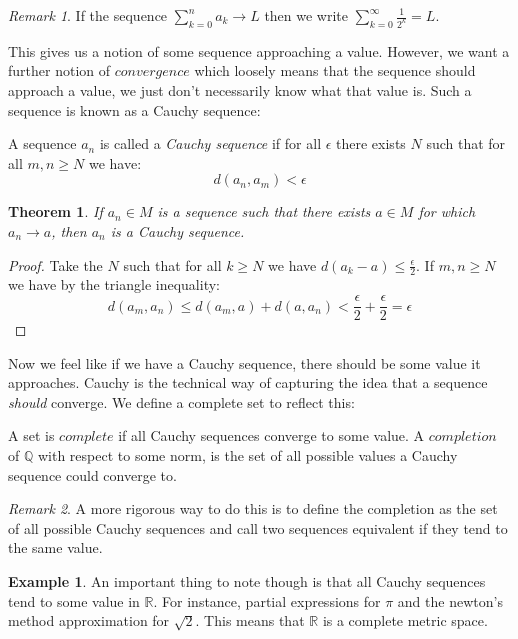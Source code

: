 \documentclass{article}
\newcommand{\R}{\mathbb{R}}
\newenvironment{definition}[1][Definition:]{\begin{trivlist}
\item[\hskip \labelsep {\bfseries #1}]}{\end{trivlist}}
\theoremstyle{theorem}
\newtheorem{theorem}{Theorem}[section]
\theoremstyle{definition}
\theoremstyle{definition}
\theoremstyle{remark}
\theoremstyle{definition}
\newtheorem{example}{Example}[section]
\theoremstyle{remark}
\newtheorem{remark}{Remark}[subsection]
\begin{document}
\begin{remark}
If the sequence $\sum\limits_{k = 0}^{n} a_k \to L$ then we write $\sum\limits_{k = 0}^{\infty} \frac{1}{2^k} = L$. 
\end{remark}

This gives us a notion of some sequence approaching a value. However, we want a further notion of $\textit{convergence}$ which loosely means that the sequence should approach a value, we just don't necessarily know what that value is. Such a sequence is known as a Cauchy sequence:
\begin{definition}
A sequence $a_n$ is called a \textit{Cauchy sequence} if for all $\epsilon$ there exists $N$ such that for all $m,n \ge N$ we have:
\[d(a_n, a_m) < \epsilon\]
\end{definition}
\begin{theorem}
If $a_n \in M$ is a sequence such that there exists $a \in M$ for which $a_n\to a$, then $a_n$ is a Cauchy sequence.
\end{theorem}
\begin{proof}
Take the $N$ such that for all $k \ge N$ we have $d(a_k - a) \le \frac{\epsilon}{2}$. If $m,n \ge N$ we have by the triangle inequality:
\[d(a_m, a_n) \le d(a_m, a) + d(a, a_n) < \frac{\epsilon}{2} + \frac{\epsilon}{2} = \epsilon\]
\end{proof}
\bigskip Now we feel like if we have a Cauchy sequence, there should be some value it approaches. Cauchy is the technical way of capturing the idea that a sequence \textit{should} converge. We define a complete set to reflect this:

\begin{definition}
A set is $\textit{complete}$ if all Cauchy sequences converge to some value. A $\textit{completion}$ of $\mathbb{Q}$ with respect to some norm, is the set of all possible values a Cauchy sequence could converge to.
\end{definition} 
\begin{remark} A more rigorous way to do this is to define the completion as the set of all possible Cauchy sequences and call two sequences equivalent if they tend to the same value.
\end{remark}

\begin{example} An important thing to note though is that all Cauchy sequences tend to some value in $\mathbb{R}$. For instance, partial expressions for $\pi$ and the newton's method approximation for $\sqrt{2}$. This means that $\R$ is a complete metric space. 
\end{example}
\end{document}
